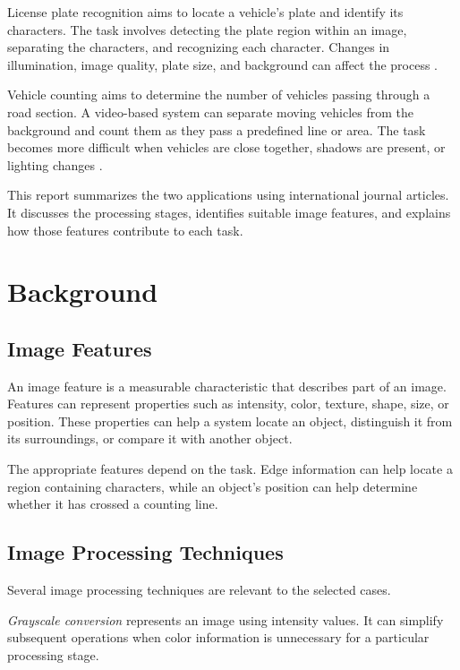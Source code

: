 \documentclass[conference]{IEEEtran}
\begin{document}
	License plate recognition aims to locate a vehicle's plate and
	identify its characters. The task involves detecting the plate region
	within an image, separating the characters, and recognizing each
	character. Changes in illumination, image quality, plate size, and
	background can affect the process \cite{arafat2020}.
	
	Vehicle counting aims to determine the number of vehicles passing
	through a road section. A video-based system can separate moving
	vehicles from the background and count them as they pass a predefined
	line or area. The task becomes more difficult when vehicles are close
	together, shadows are present, or lighting changes \cite{liu2017}.
	
	This report summarizes the two applications using international
	journal articles. It discusses the processing stages, identifies
	suitable image features, and explains how those features contribute to
	each task.

	
	\section{Background}
	
	\subsection{Image Features}
	
	An image feature is a measurable characteristic that describes part
	of an image. Features can represent properties such as intensity,
	color, texture, shape, size, or position. These properties can help a
	system locate an object, distinguish it from its surroundings, or
	compare it with another object.
	
	The appropriate features depend on the task. Edge information can help
	locate a region containing characters, while an object's position can
	help determine whether it has crossed a counting line.
	
	\subsection{Image Processing Techniques}
	
	Several image processing techniques are relevant to the selected cases.
	
	\textit{Grayscale conversion} represents an image using intensity
	values. It can simplify subsequent operations when color information is
	unnecessary for a particular processing stage.
	
\end{document}
